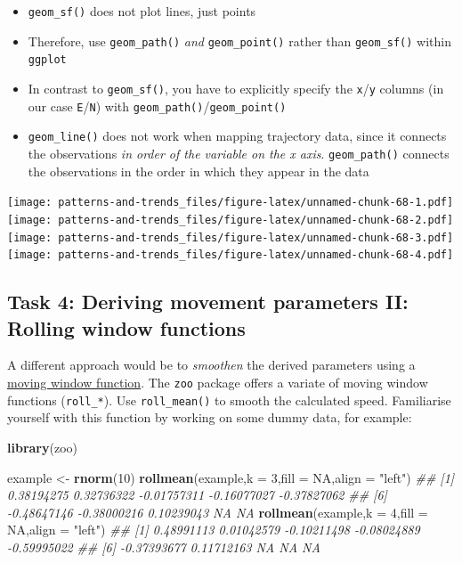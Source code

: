 \documentclass[]{book}
\newenvironment{Shaded}{\begin{snugshade}}{\end{snugshade}}
\newcommand{\CommentTok}[1]{\textcolor[rgb]{0.56,0.35,0.01}{\textit{#1}}}
\newcommand{\DataTypeTok}[1]{\textcolor[rgb]{0.13,0.29,0.53}{#1}}
\newcommand{\DecValTok}[1]{\textcolor[rgb]{0.00,0.00,0.81}{#1}}
\newcommand{\KeywordTok}[1]{\textcolor[rgb]{0.13,0.29,0.53}{\textbf{#1}}}
\newcommand{\NormalTok}[1]{#1}
\newcommand{\OtherTok}[1]{\textcolor[rgb]{0.56,0.35,0.01}{#1}}
\newcommand{\StringTok}[1]{\textcolor[rgb]{0.31,0.60,0.02}{#1}}
\providecommand{\tightlist}{%
  \setlength{\itemsep}{0pt}\setlength{\parskip}{0pt}}
\begin{document}
\begin{itemize}
\tightlist
\item
  \texttt{geom\_sf()} does not plot lines, just points
\item
  Therefore, use \texttt{geom\_path()} \emph{and} \texttt{geom\_point()} rather than \texttt{geom\_sf()} within \texttt{ggplot}
\item
  In contrast to \texttt{geom\_sf()}, you have to explicitly specify the \texttt{x}/\texttt{y} columns (in our case \texttt{E}/\texttt{N}) with \texttt{geom\_path()}/\texttt{geom\_point()}
\item
  \texttt{geom\_line()} does not work when mapping trajectory data, since it connects the observations \emph{in order of the variable on the x axis}. \texttt{geom\_path()} connects the observations in the order in which they appear in the data
\end{itemize}

\texttt{[image: patterns-and-trends\_files/figure-latex/unnamed-chunk-68-1.pdf]} \texttt{[image: patterns-and-trends\_files/figure-latex/unnamed-chunk-68-2.pdf]} \texttt{[image: patterns-and-trends\_files/figure-latex/unnamed-chunk-68-3.pdf]} \texttt{[image: patterns-and-trends\_files/figure-latex/unnamed-chunk-68-4.pdf]}

\hypertarget{task-4-deriving-movement-parameters-ii-rolling-window-functions}{%
\subsection{Task 4: Deriving movement parameters II: Rolling window functions}\label{task-4-deriving-movement-parameters-ii-rolling-window-functions}}

A different approach would be to \emph{smoothen} the derived parameters using a \href{https://docs.wavefront.com/images/5sec_moving_window.png}{moving window function}. The \texttt{zoo} package offers a variate of moving window functions (\texttt{roll\_*}). Use \texttt{roll\_mean()} to smooth the calculated speed. Familiarise yourself with this function by working on some dummy data, for example:

\begin{Shaded}
\begin{Highlighting}[]
\KeywordTok{library}\NormalTok{(zoo)}

\NormalTok{example <-}\StringTok{ }\KeywordTok{rnorm}\NormalTok{(}\DecValTok{10}\NormalTok{)}
\KeywordTok{rollmean}\NormalTok{(example,}\DataTypeTok{k =} \DecValTok{3}\NormalTok{,}\DataTypeTok{fill =} \OtherTok{NA}\NormalTok{,}\DataTypeTok{align =} \StringTok{"left"}\NormalTok{)}
\CommentTok{##  [1]  0.38194275  0.32736322 -0.01757311 -0.16077027 -0.37827062}
\CommentTok{##  [6] -0.48647146 -0.38000216  0.10239043          NA          NA}
\KeywordTok{rollmean}\NormalTok{(example,}\DataTypeTok{k =} \DecValTok{4}\NormalTok{,}\DataTypeTok{fill =} \OtherTok{NA}\NormalTok{,}\DataTypeTok{align =} \StringTok{"left"}\NormalTok{)}
\CommentTok{##  [1]  0.48991113  0.01042579 -0.10211498 -0.08024889 -0.59995022}
\CommentTok{##  [6] -0.37393677  0.11712163          NA          NA          NA}
\end{Highlighting}
\end{Shaded}
\end{document}
